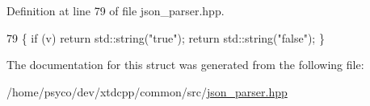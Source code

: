 Definition at line 79 of file json\+\_\+parser.\+hpp.


\begin{DoxyCode}
79 \{ \textcolor{keywordflow}{if} (v) \textcolor{keywordflow}{return} std::string(\textcolor{stringliteral}{"true"}); \textcolor{keywordflow}{return} std::string(\textcolor{stringliteral}{"false"}); \}
\end{DoxyCode}


The documentation for this struct was generated from the following file\+:\begin{DoxyCompactItemize}
\item 
/home/psyco/dev/xtdcpp/common/src/\hyperlink{json__parser_8hpp}{json\+\_\+parser.\+hpp}\end{DoxyCompactItemize}
